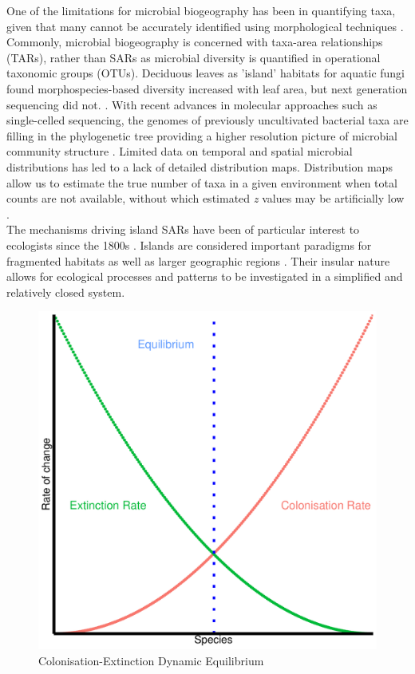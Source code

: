 \noindent One of the limitations for microbial biogeography has been in quantifying taxa, given that many cannot be accurately identified using morphological techniques \cite{GreenJessica2006Ssom}. Commonly, microbial biogeography is concerned with taxa-area relationships (TARs), rather than SARs as microbial diversity is quantified in operational taxonomic groups (OTUs). Deciduous leaves as 'island' habitats for aquatic fungi found morphospecies-based diversity increased with leaf area, but next generation sequencing did not. \cite{duarte2017taxa}. With recent advances in molecular approaches such as single-celled sequencing, the genomes of previously uncultivated bacterial taxa are filling in the phylogenetic tree providing a higher resolution picture of microbial community structure \cite{lasken2014recent}. Limited data on temporal and spatial microbial distributions has led to a lack of detailed distribution maps. Distribution maps allow us to estimate the true number of taxa in a given environment when total counts are not available, without which estimated \textit{z} values may be artificially low \cite{GreenJessica2006Ssom}.\\


\noindent The mechanisms driving island SARs have been of particular interest to ecologists since the 1800s \cite{macdonald2018theory}. Islands are considered important paradigms for fragmented habitats as well as larger geographic regions \cite{simberloff1974equilibrium}. Their insular nature allows for ecological processes and patterns to be investigated in a simplified and relatively closed system. \\


\begin{figure}[htp]

\centering
\includegraphics[width=.5\textwidth]{ColonisationDynamicEquilibrium.pdf}\hfill

\caption{Colonisation-Extinction Dynamic Equilibrium}
\label{fig:figure1}

\end{figure}

